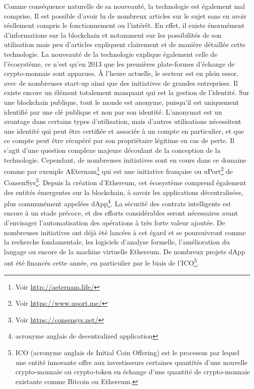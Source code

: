 \documentclass{tnreport}
\begin{document}
Comme conséquence naturelle de sa nouveauté, la technologie est également mal comprise.
Il est possible d'avoir lu de nombreux articles sur le sujet sans en avoir réellement compris le fonctionnement ou l'intérêt.
En effet, il existe énormément d'informations sur la blockchain et notamment sur les possibilités de son utilisation mais peu d'articles expliquent clairement et de manière détaillée cette technologie.
La nouveauté de la technologie explique également celle de l'écosystème, ce n'est qu'en 2013 que les premières plate-formes d'échange de crypto-monnaie sont apparues.
À l'heure actuelle, le secteur est en plein essor, avec de nombreuses start-up ainsi que des initiatives de grandes entreprises.
Il existe encore un élément totalement manquant qui est la gestion de l'identité.
Sur une blockchain publique, tout le monde est anonyme, puisqu'il est uniquement identifié par une clé publique et non par son identité.
L'anonymat est un avantage dans certains types d'utilisation, mais d'autres utilisations nécessitent une identité qui peut être certifiée et associée à un compte en particulier, et que ce compte peut être récupéré par son propriétaire légitime en cas de perte.
Il s'agit d'une question complexe majeure découlant de la conception de la technologie. Cependant, de nombreuses initiatives sont en cours dans ce domaine comme par exemple AEternam\footnote{Voir \url{http://aeternam.life/}} qui est une initiative française ou uPort\footnote{Voir \url{https://www.uport.me/}} de ConsenSys\footnote{Voir \url{https://consensys.net/}}.
Depuis la création d'Ethereum, cet écosystème comprend également des entités émergentes sur la blockchain, à savoir les applications décentralisées, plus communément appelées dApp\footnote{acronyme anglais de decentralized application}.
La sécurité des contrats intelligents est encore à un stade précoce, et des efforts considérables seront nécessaires avant d'envisager l'automatisation des opérations à très forte valeur ajoutée.
De nombreuses initiatives ont déjà été lancées à cet égard et se poursuivront comme la recherche fondamentale, les logiciels d'analyse formelle, l'amélioration du langage ou encore de la machine virtuelle Ethereum.
De nombreux projets dApp ont été financés cette année, en particulier par le biais de l'ICO\footnote{
ICO (acronyme anglais de Initial Coin Offering) est le processus par lequel une entité innovante offre aux investisseurs certaines quantités d'une nouvelle crypto-monnaie ou crypto-token en échange d'une quantité de crypto-monnaie existante comme Bitcoin ou Ethereum.}.
\end{document}

